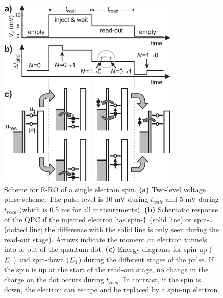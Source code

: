 \documentclass[12pt,aps,nofootinbib]{revtex4-1}
\begin{document}
\begin{figure}[hbt]
\includegraphics[width=3.4in, clip=true]{hanson_fig15.eps}
\caption{Scheme for E-RO of a single electron spin. \textbf{(a)}
Two-level voltage pulse scheme. The pulse level is 10 mV during
$t_{wait}$ and 5 mV during $t_{read}$ (which is 0.5 ms for all
measurements). \textbf{(b)} Schematic response of the QPC if the
injected electron has spin-$\uparrow$ (solid line) or spin-$\downarrow$
(dotted line; the difference with the solid line is only seen
during the read-out stage). Arrows indicate the moment an electron
tunnels into or out of the quantum dot. \textbf{(c)} Energy
diagrams for spin-up ($E_{\uparrow}$) and spin-down ($E_{\downarrow}$) during
the different stages of the pulse. If the spin is up at the start
of the read-out stage, no change in the charge on the dot occurs
during $t_{read}$. In contrast, if the spin is down, the electron
can escape and be replaced by a spin-up electron.}
\label{Fig:EROpulse}
\end{figure}
\end{document}

